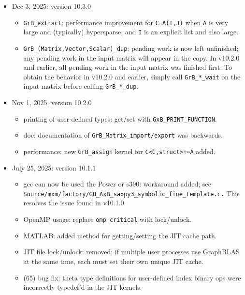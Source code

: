 \begin{itemize}
    \begin{itemize}
    \item (67) bug fix:  incorrect JIT kernel constructed for R=masker(C,M,Z)
        when R is hypersparse.  Found by Roi Lipman, FalkorDB.
    \item (66) bug fix:  \verb'GB_bitonic' did not compile with the MS cl
        compiler.  Found by Erik Welch, NVIDIA.
    \end{itemize}

\item Dec 3, 2025: version 10.3.0

    \begin{itemize}
    \item \verb'GrB_extract': performance improvement for \verb'C=A(I,J)' when
        \verb'A' is very large and (typically) hypersparse, and \verb'I' is an
        explicit list and also large.
    \item \verb'GrB_(Matrix,Vector,Scalar)_dup':  pending work is now left
        unfinished; any pending work in the input matrix will appear in the
        copy.  In v10.2.0 and earlier, all pending work in the input matrix was
        finished first.  To obtain the behavior in v10.2.0 and earlier, simply
        call \verb'GrB_*_wait' on the input matrix before calling
        \verb'GrB_*_dup'.
    \end{itemize}

\item Nov 1, 2025: version 10.2.0

    \begin{itemize}
    \item printing of user-defined types: get/set with
        \verb'GxB_PRINT_FUNCTION'.
    \item doc: documentation of \verb'GrB_Matrix_import/export' was backwards.
    \item performance: new \verb'GrB_assign' kernel for \verb'C<C,struct>+=A'
        added.
    \end{itemize}

\item July 25, 2025: version 10.1.1

    \begin{itemize}
    \item gcc can now be used the Power or s390:  workaround added;
        see \verb'Source/mxm/factory/GB_AxB_saxpy3_symbolic_fine_template.c.'
	This resolves the issue found in v10.1.0.
    \item OpenMP usage: replace \verb'omp critical' with lock/unlock.
    \item MATLAB: added method for getting/setting the JIT cache path.
    \item JIT file lock/unlock: removed; if multiple user processes use
        GraphBLAS at the same time, each must set their own unique JIT cache.
    \item (65) bug fix: theta type definitions for user-defined index
        binary ops were incorrectly typedef'd in the JIT kernels.
    \end{itemize}


\end{itemize}
